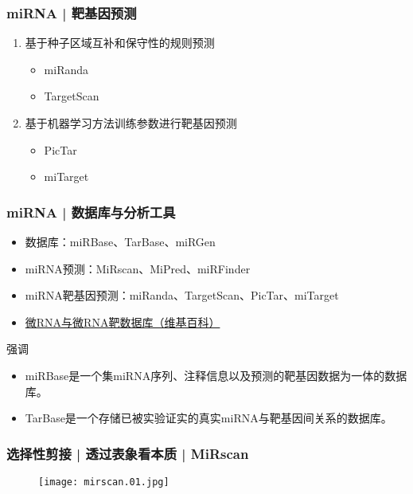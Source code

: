 \begin{frame}
  \frametitle{miRNA | \alert{靶基因预测}}
  \begin{enumerate}
    \item 基于种子区域互补和保守性的规则预测
      \begin{itemize}
        \item miRanda
        \item TargetScan
      \end{itemize}
    \item 基于机器学习方法训练参数进行靶基因预测
      \begin{itemize}
        \item PicTar
        \item miTarget
      \end{itemize}
  \end{enumerate}
\end{frame}

\begin{frame}
  \frametitle{miRNA | 数据库与分析工具}
  \begin{itemize}
    \item 数据库：miRBase、TarBase、miRGen
    \item miRNA预测：MiRscan、MiPred、miRFinder
    \item miRNA靶基因预测：miRanda、TargetScan、PicTar、miTarget
    \item \href{http://zh.wikipedia.org/wiki/\%E5\%BE\%AERNA\%E4\%B8\%8E\%E5\%BE\%AERNA\%E9\%9D\%B6\%E6\%95\%B0\%E6\%8D\%AE\%E5\%BA\%93}{微RNA与微RNA靶数据库（维基百科）}
  \end{itemize}
  \pause
  \begin{block}{强调}
    \begin{itemize}
      \item miRBase是一个集miRNA序列、注释信息以及预测的靶基因数据为一体的数据库。
      \item TarBase是一个存储已被实验证实的真实miRNA与靶基因间关系的数据库。
    \end{itemize}
  \end{block}
\end{frame}

\begin{frame}
  \frametitle{选择性剪接 | 透过表象看本质 | MiRscan}
  \begin{figure}
    \centering
    \texttt{[image: mirscan.01.jpg]}
  \end{figure}
\end{frame}

